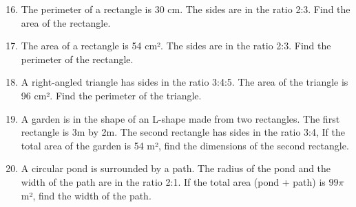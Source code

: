 \documentclass[12pt,a4paper]{article}
\begin{document}
\begin{enumerate}
    \setcounter{enumi}{15}
    \item The perimeter of a rectangle is 30 cm. The sides are in the ratio 2:3. Find the area of the rectangle.
    
    \item The area of a rectangle is 54 cm². The sides are in the ratio 2:3. Find the perimeter of the rectangle.
    

    \item A right-angled triangle has sides in the ratio 3:4:5. The area of the triangle is 96 cm². Find the perimeter of the triangle.
    

    \item A garden is in the shape of an L-shape made from two rectangles. The first rectangle is 3m by 2m. The second rectangle has sides in the ratio 3:4, If the total area of the garden is 54 m², find the dimensions of the second rectangle.
    

    \newpage{}

    \item A circular pond is surrounded by a path. The radius of the pond and the width of the path are in the ratio 2:1. If the total area (pond + path) is $99\pi$m², find the width of the path.
    
\end{enumerate}
\end{document}
